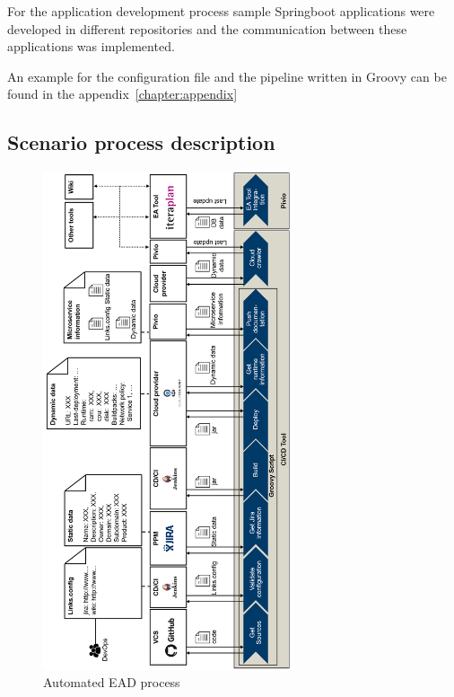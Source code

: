For the application development process sample Springboot applications were developed in different repositories and the communication between these applications was implemented.

An example for the configuration file and the pipeline written in Groovy can be found in the appendix~\ref{chapter:appendix}

\subsection{Scenario process description}\label{subsection:scenarioprocessdescription}

\begin{figure}[htpb]
  \centering
  \includegraphics[width=0.65\textwidth]{figures/automated-ead-process-gedreht.png}
  \caption{Automated EAD process}
  \label{fig:Automated-EAD-process}
\end{figure}

